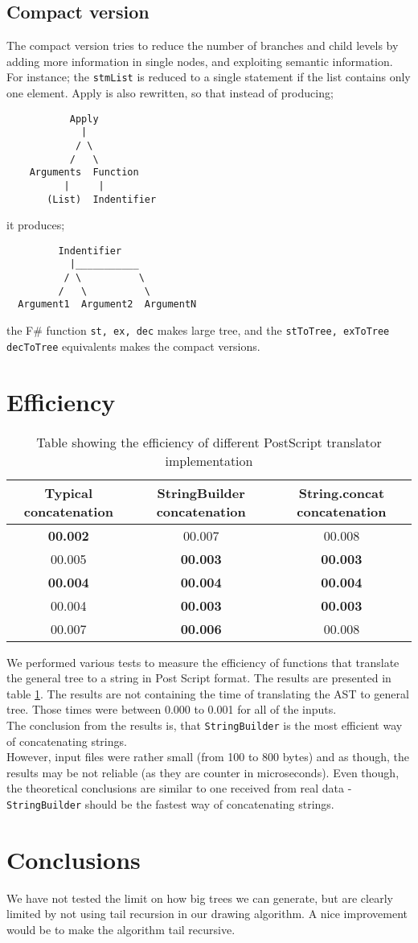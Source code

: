 \documentclass[10pt]{scrartcl}
\begin{document}
\subsection{Compact version}
The compact version tries to reduce the number of branches and child levels by adding more information in single nodes, and exploiting semantic information. For instance; the \texttt{stmList} is reduced to a single statement if the list contains only one element. Apply is also rewritten, so that instead of producing;
\begin{verbatim}
           Apply
             |
            / \
           /   \
    Arguments  Function
          |     |
       (List)  Indentifier
\end{verbatim}
it produces;
\begin{verbatim}
         Indentifier
           |___________
          / \          \
         /   \          \
  Argument1  Argument2  ArgumentN
\end{verbatim}
the F\# function \texttt{st, ex, dec} makes large tree, and the \texttt{stToTree, exToTree decToTree} equivalents makes the compact versions.
\section{Efficiency}
\begin{table} [!h]
\centering
\begin{tabular}{c|c|c}
  \textbf{Typical concatenation}  & \textbf{StringBuilder concatenation} & \textbf{String.concat concatenation} \\
  \hline
  \textbf{00.002} & 00.007 & 00.008 \\
  \hline
  00.005 & \textbf{00.003} & \textbf{00.003} \\
  \hline
  \textbf{00.004} & \textbf{00.004} & \textbf{00.004} \\
  \hline
  00.004 & \textbf{00.003} & \textbf{00.003} \\
  \hline
  00.007 & \textbf{00.006} & 00.008 \\
\end{tabular} 
\caption{Table showing the efficiency of different PostScript translator implementation}
\label{tab:eff}
\end{table}
We performed various  tests to measure the efficiency of functions that translate the general tree to a string in Post Script format. The results are presented in table \ref{tab:eff}. The results are not containing the time of translating the AST to general tree. Those times were between 0.000 to 0.001 for all of the inputs. \\
The conclusion from the results is, that \texttt{StringBuilder} is the most efficient way of concatenating strings. \\
However, input files were rather small (from 100 to 800 bytes) and as though, the results may be not reliable (as they are counter in microseconds). Even though, the theoretical conclusions are similar to one received from real data - \texttt{StringBuilder} should be the fastest way of concatenating strings. 
\section{Conclusions}
We have not tested the limit on how big trees we can generate, but are clearly limited by not using tail recursion in our drawing algorithm. A nice improvement would be to make the algorithm tail recursive.



\end{document}
